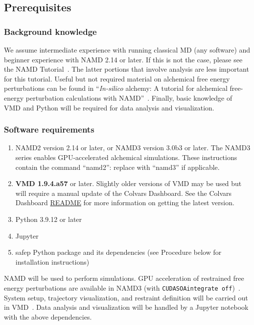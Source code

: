 \documentclass[9pt,tutorial]{Styling/livecoms}
\newcommand{\textInput}[1]{\texttt{#1}}
\begin{document}
\subsection{Prerequisites}
    \subsubsection{Background knowledge}\label{sec:prerequisites}
    
    We assume intermediate experience with running classical MD (any software) and beginner experience with NAMD 2.14 or later. If this is not the case, please see the NAMD Tutorial~\cite{phillips2003}. The latter portions that involve analysis are less important for this tutorial. Useful but not required material on alchemical free energy perturbations can be found in “\textit{In-silico} alchemy: A tutorial for alchemical free-energy perturbation calculations with NAMD”~\cite{Henin2017}. Finally, basic knowledge of VMD and Python will be required for data analysis and visualization.  

\subsubsection{Software requirements}\label{sec:software}
    \begin{enumerate}
        \item NAMD2 version 2.14 or later, or NAMD3 version 3.0b3 or later. The NAMD3 series enables GPU-accelerated alchemical simulations. These instructions contain the command ``namd2'': replace with ``namd3'' if applicable.
        \item \textbf{VMD 1.9.4.a57} or later. Slightly older versions of VMD may be used but will require a manual update of the Colvars Dashboard. See the Colvars Dashboard \href{https://github.com/Colvars/colvars/tree/master/vmd/cv_dashboard}{README} for more information on getting the latest version.
        \item Python 3.9.12 or later
        \item Jupyter
        \item safep Python package and its dependencies (see Procedure below for installation instructions)
    \end{enumerate}

NAMD will be used to perform simulations. GPU acceleration of restrained free energy perturbations are available in NAMD3 (with \textInput{CUDASOAintegrate off})~\cite{Chen2020, Phillips2020}. System setup, trajectory visualization, and restraint definition will be carried out in VMD~\cite{Humphrey1996}. Data analysis and visualization will be handled by a Jupyter notebook with the above dependencies.
\end{document}
